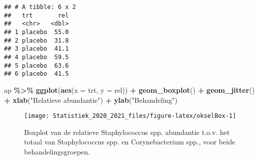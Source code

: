 \documentclass[
  12pt,dutch,coursenotes]{book}
\newenvironment{Shaded}{\begin{snugshade}}{\end{snugshade}}
\newcommand{\CommentTok}[1]{\textcolor[rgb]{0.56,0.35,0.01}{\textit{#1}}}
\newcommand{\DataTypeTok}[1]{\textcolor[rgb]{0.13,0.29,0.53}{#1}}
\newcommand{\KeywordTok}[1]{\textcolor[rgb]{0.13,0.29,0.53}{\textbf{#1}}}
\newcommand{\NormalTok}[1]{#1}
\newcommand{\OperatorTok}[1]{\textcolor[rgb]{0.81,0.36,0.00}{\textbf{#1}}}
\newcommand{\StringTok}[1]{\textcolor[rgb]{0.31,0.60,0.02}{#1}}
\theoremstyle{definition}
\theoremstyle{definition}
\theoremstyle{definition}
\theoremstyle{remark}
\begin{document}
\begin{verbatim}
## # A tibble: 6 x 2
##   trt       rel
##   <chr>   <dbl>
## 1 placebo  55.0
## 2 placebo  31.8
## 3 placebo  41.1
## 4 placebo  59.5
## 5 placebo  63.6
## 6 placebo  41.5
\end{verbatim}

\begin{Shaded}
\begin{Highlighting}[]
\NormalTok{ap }\OperatorTok{\%\textgreater{}\%}\StringTok{ }\KeywordTok{ggplot}\NormalTok{(}\KeywordTok{aes}\NormalTok{(}\DataTypeTok{x =}\NormalTok{ trt, }\DataTypeTok{y =}\NormalTok{ rel)) }\OperatorTok{+}\StringTok{ }\KeywordTok{geom\_boxplot}\NormalTok{() }\OperatorTok{+}\StringTok{ }
\StringTok{    }\KeywordTok{geom\_jitter}\NormalTok{() }\OperatorTok{+}\StringTok{ }\KeywordTok{xlab}\NormalTok{(}\StringTok{"Relatieve abundantie"}\NormalTok{) }\OperatorTok{+}\StringTok{ }
\StringTok{    }\KeywordTok{ylab}\NormalTok{(}\StringTok{"Behandeling"}\NormalTok{)}
\end{Highlighting}
\end{Shaded}

\begin{figure}

{\centering \texttt{[image: Statistiek\_2020\_2021\_files/figure-latex/okselBox-1]} 

}

\caption{Boxplot van de relatieve Staphylococcus spp. abundantie t.o.v. het totaal van Staphylococcus spp. en Corynebacterium spp., voor beide behandelingsgroepen.}\label{fig:okselBox}
\end{figure}

\begin{Shaded}
\end{Shaded}
\end{document}
